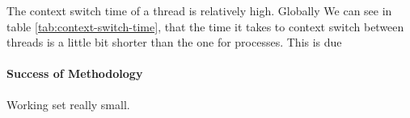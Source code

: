 The context switch time of a thread is relatively high.
Globally
We can see in table \ref{tab:context-switch-time}, that the
time it takes to context switch between threads is a little bit shorter
than the one for processes.
This is due 

\paragraph{Success of Methodology}
Working set really small.


